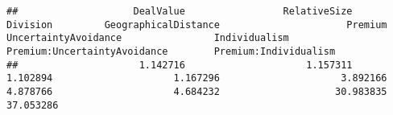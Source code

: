 \documentclass[]{article}
\begin{document}
\begin{verbatim}
##                    DealValue                 RelativeSize                     Division         GeographicalDistance                      Premium         UncertaintyAvoidance                Individualism Premium:UncertaintyAvoidance        Premium:Individualism 
##                     1.142716                     1.157311                     1.102894                     1.167296                     3.892166                     4.878766                     4.684232                    30.983835                    37.053286
\end{verbatim}
\end{document}
